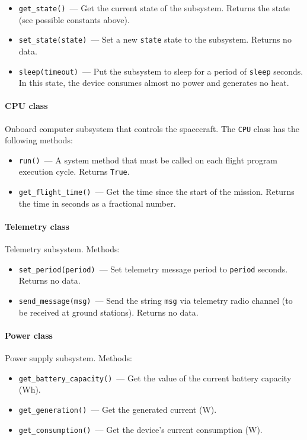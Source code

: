 \documentclass[12pt,a4paper]{article}
\begin{document}
\begin{itemize}
\item \verb'get_state()'~--- Get the current state of the subsystem. Returns the state (see possible constants above).
\item \verb'set_state(state)'~--- Set a new \verb'state' state to the subsystem. Returns no data.
\item \verb'sleep(timeout)'~--- Put the subsystem to sleep for a period of \verb'sleep' seconds. In this state, the device consumes almost no power and generates no heat.
\end{itemize}

\paragraph{CPU class}

Onboard computer subsystem that controls the spacecraft. The \verb'CPU' class has the following methods:

\begin{itemize}
\item \verb'run()'~--- A system method that must be called on each flight program execution cycle. Returns \verb'True'.
\item \verb'get_flight_time()'~--- Get the time since the start of the mission. Returns the time in seconds as a fractional number.
\end{itemize}

\paragraph{Telemetry class}

Telemetry subsystem. Methods:

\begin{itemize}
\item \verb'set_period(period)'~--- Set telemetry message period to \verb'period' seconds. Returns no data.
\item \verb'send_message(msg)'~--- Send the string \verb'msg' via telemetry radio channel (to be received at ground stations). Returns no data.
\end{itemize}

\paragraph{Power class}

Power supply subsystem. Methods:

\begin{itemize}
\item \verb'get_battery_capacity()'~--- Get the value of the current battery capacity (Wh).
\item \verb'get_generation()'~--- Get the generated current (W).
\item \verb'get_consumption()'~--- Get the device's current consumption (W).
\end{itemize}
\end{document}
